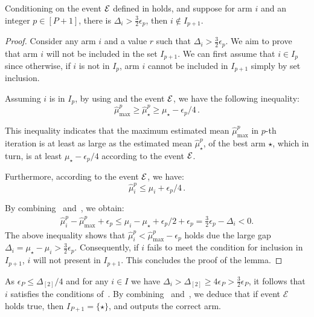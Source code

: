 \begin{lemma}\label{lem:eliminate-large-gap}
    Conditioning on the event \(\mathcal{E}\) defined in  holds, and suppose for arm \(i\) and an integer $p\in [P+1]$, there is \(\Delta_i > \frac{3}{2}\epsilon_p\), then \(i \notin I_{p + 1}\).
\end{lemma}

\begin{proof}
    Consider any arm \(i\) and a value \(r\) such that \(\Delta_i > \frac{3}{2} \epsilon_p \). We aim to prove that arm \(i\) will not be included in the set \(I_{p  +1}\). We can first assume that \(i\in I_p\) since otherwise, if \(i\) is not in \(I_p\), arm \(i\) cannot be included in \(I_{p + 1}\) simply by set inclusion.

    Assuming \(i\) is in \(I_p\), by using  and the event \(\mathcal{E}\), we have the following inequality:
    \begin{equation}\label{eq:a1}
        \hat{\mu}^{p}_{\max} \geq \hat{\mu}^{p}_{\star} \geq \mu_\star - \epsilon_p / 4\,.
    \end{equation}

    This inequality indicates that the maximum estimated mean \(\hat{\mu}^{p}_{\max}\) in \(p\)-th iteration is at least as large as the estimated mean \(\hat{\mu}^p_\star\), of the best arm \(\star\), which in turn, is at least \(\mu_\star - \epsilon_p / 4\) according to the event \(\mathcal{E}\). 

    Furthermore, according to the event \(\mathcal{E}\), we have:
    \begin{equation}\label{eq:a2}
        \hat{\mu}^p_i \leq \mu_i + \epsilon_p / 4\,.
    \end{equation}
    
    By combining~ and~, we obtain: 
    \begin{align*}
        \hat{\mu}^{p}_i - \hat{\mu}^{p}_{\max} + \epsilon_p \le \mu_{i} - \mu_{\star} + \epsilon_p / 2 + \epsilon_p = \frac{3}{2} \epsilon_p - \Delta_i < 0.
    \end{align*}
    The above inequality shows that \(\hat{\mu}^p_i < \hat{\mu}^p_{\max} -\epsilon_p\) holds due the large gap \(\Delta_i = \mu_{\star} - \mu_i > \frac{3}{2}\epsilon_{p}\). 
    Consequently, if \(i\) fails to meet the condition for inclusion in \(I_{p + 1}\), \(i\) will not present in \(I_{p + 1}\). This concludes the proof of the lemma. 
\end{proof}

As \(\epsilon_P \le \Delta_{[2]}/4\) and for any \(i \in I\) we have \(\Delta_i > \Delta_{[2]} \ge 4\epsilon_P > \frac{3}{2}\epsilon_P\), it follows that \(i\) satisfies the conditions of~. By combining~ and~, we deduce that if event \(\mathcal{E}\) holds true, then \(I_{P + 1} = \{\star\}\), and  outputs the correct arm.

